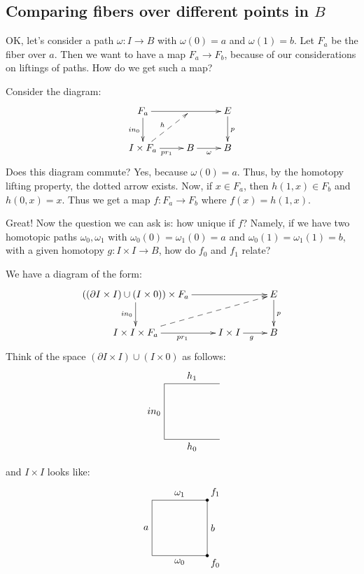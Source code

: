 \subsection{Comparing fibers over different points in $B$}
OK, let's consider a path $\omega:I\to B$ with $\omega(0) = a$ and $\omega(1) = b$. Let $F_a$ be the fiber over $a$. Then we want to have a map $F_a\to F_b$, because of our considerations on liftings of paths. How do we get such a map?

Consider the diagram:
\begin{equation*}
    \xymatrix{
	F_a\ar[d]_{in_0}\ar[rr] & & E\ar[d]^p\\
	I\times F_a\ar@{-->}[ur]^{h}\ar[r]_{pr_1} & B\ar[r]_{\omega} & B
    }
\end{equation*}
Does this diagram commute? Yes, because $\omega(0) = a$. Thus, by the homotopy lifting property, the dotted arrow exists. Now, if $x\in F_a$, then $h(1,x) \in F_b$ and $h(0,x) = x$. Thus we get a map $f:F_a\to F_b$ where $f(x) = h(1,x)$.

Great! Now the question we can ask is: how unique if $f$? Namely, if we have two homotopic paths $\omega_0,\omega_1$ with $\omega_0(0) = \omega_1(0) = a$ and $\omega_0(1) = \omega_1(1) = b$, with a given homotopy $g:I\times I\to B$, how do $f_0$ and $f_1$ relate?

We have a diagram of the form:
\begin{equation*}
    \xymatrix{
	((\partial I\times I)\cup (I\times 0))\times F_a\ar[d]_{in_0}\ar[rr] & & E\ar[d]^p\\
	I\times I\times F_a\ar[r]_{pr_1}\ar@{-->}[urr] & I\times I\ar[r]_g & B
    }
\end{equation*}
Think of the space $(\partial I\times I)\cup (I\times 0)$ as follows:
\begin{equation*}
\begin{tikzpicture}
    \draw (2,2) -- (0,2) -- (0,0) -- (2,0);
    \node [above] at (1,2) {$h_1$};
    \node [below] at (1,0) {$h_0$};
    \node [left] at (0,1) {$in_0$};
\end{tikzpicture}
\end{equation*}
and $I\times I$ looks like:
\begin{equation*}
    \begin{tikzpicture}
	\draw (0,0) -- (0,2) -- (2,2) -- (2,0) -- (0,0);
	\draw[fill] (2,2) circle [radius=0.05];
	\draw[fill] (2,0) circle [radius=0.05];
	\node [left] at (0,1) {$a$};
	\node [above] at (1,2) {$\omega_1$};
	\node [below] at (1,0) {$\omega_0$};
	\node [right] at (2,1) {$b$};
	\node [above right] at (2,2) {$f_1$};
	\node [below right] at (2,0) {$f_0$};
    \end{tikzpicture}
\end{equation*}

